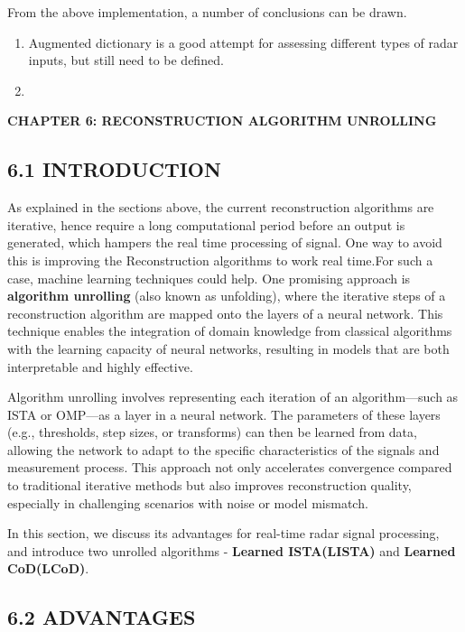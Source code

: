 \documentclass[
  letterpaper,
  DIV=11,
  numbers=noendperiod]{scrartcl}
\providecommand{\mainsection}[1]{\begin{center}{\rmfamily\textbf{\fontsize{14}{20}\selectfont #1}}\end{center}}
\begin{document}
From the above implementation, a number of conclusions can be drawn.

\begin{enumerate}
\def\labelenumi{\arabic{enumi}.}
\item
  Augmented dictionary is a good attempt for assessing different types
  of radar inputs, but still need to be defined.
\item
\end{enumerate}

\newpage

\mainsection{CHAPTER 6: RECONSTRUCTION ALGORITHM UNROLLING}

\subsection{6.1 INTRODUCTION}\label{introduction-3}

As explained in the sections above, the current reconstruction
algorithms are iterative, hence require a long computational period
before an output is generated, which hampers the real time processing of
signal. One way to avoid this is improving the Reconstruction algorithms
to work real time.For such a case, machine learning techniques could
help. One promising approach is \textbf{algorithm unrolling} (also known
as unfolding), where the iterative steps of a reconstruction algorithm
are mapped onto the layers of a neural
network\autocite{fast-sparse-coding}. This technique enables the
integration of domain knowledge from classical algorithms with the
learning capacity of neural networks, resulting in models that are both
interpretable and highly effective.

Algorithm unrolling involves representing each iteration of an
algorithm---such as ISTA or OMP---as a layer in a neural network. The
parameters of these layers (e.g., thresholds, step sizes, or transforms)
can then be learned from data, allowing the network to adapt to the
specific characteristics of the signals and measurement process. This
approach not only accelerates convergence compared to traditional
iterative methods but also improves reconstruction quality, especially
in challenging scenarios with noise or model mismatch.

In this section, we discuss its advantages for real-time radar signal
processing, and introduce two unrolled algorithms - \textbf{Learned
ISTA(LISTA)} and \textbf{Learned CoD(LCoD)}.

\subsection{6.2 ADVANTAGES}\label{advantages}
\end{document}
